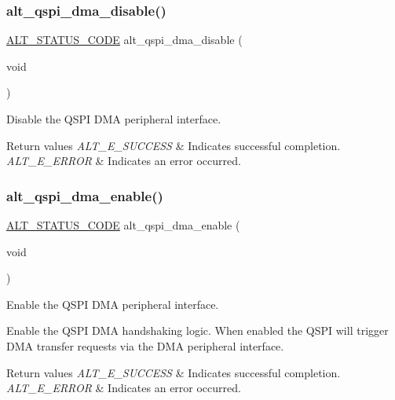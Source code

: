 \subsubsection{\texorpdfstring{alt\_qspi\_dma\_disable()}{alt\_qspi\_dma\_disable()}}
{\footnotesize\ttfamily \mbox{\hyperlink{hwlib_8h_abdb0d369f069723ca55d6c94bcaaaa12}{A\+L\+T\+\_\+\+S\+T\+A\+T\+U\+S\+\_\+\+C\+O\+DE}} alt\+\_\+qspi\+\_\+dma\+\_\+disable (\begin{DoxyParamCaption}\item[{void}]{ }\end{DoxyParamCaption})}

Disable the Q\+S\+PI D\+MA peripheral interface.


\begin{DoxyRetVals}{Return values}
{\em A\+L\+T\+\_\+\+E\+\_\+\+S\+U\+C\+C\+E\+SS} & Indicates successful completion. \\
\hline
{\em A\+L\+T\+\_\+\+E\+\_\+\+E\+R\+R\+OR} & Indicates an error occurred. \\
\hline
\end{DoxyRetVals}
\mbox{\label{group__ALT__QSPI__DMA_gab7335b92adfb09af82a3e7e92e2c1765}} 
\subsubsection{\texorpdfstring{alt\_qspi\_dma\_enable()}{alt\_qspi\_dma\_enable()}}
{\footnotesize\ttfamily \mbox{\hyperlink{hwlib_8h_abdb0d369f069723ca55d6c94bcaaaa12}{A\+L\+T\+\_\+\+S\+T\+A\+T\+U\+S\+\_\+\+C\+O\+DE}} alt\+\_\+qspi\+\_\+dma\+\_\+enable (\begin{DoxyParamCaption}\item[{void}]{ }\end{DoxyParamCaption})}

Enable the Q\+S\+PI D\+MA peripheral interface.

Enable the Q\+S\+PI D\+MA handshaking logic. When enabled the Q\+S\+PI will trigger D\+MA transfer requests via the D\+MA peripheral interface.


\begin{DoxyRetVals}{Return values}
{\em A\+L\+T\+\_\+\+E\+\_\+\+S\+U\+C\+C\+E\+SS} & Indicates successful completion. \\
\hline
{\em A\+L\+T\+\_\+\+E\+\_\+\+E\+R\+R\+OR} & Indicates an error occurred. \\
\hline
\end{DoxyRetVals}
